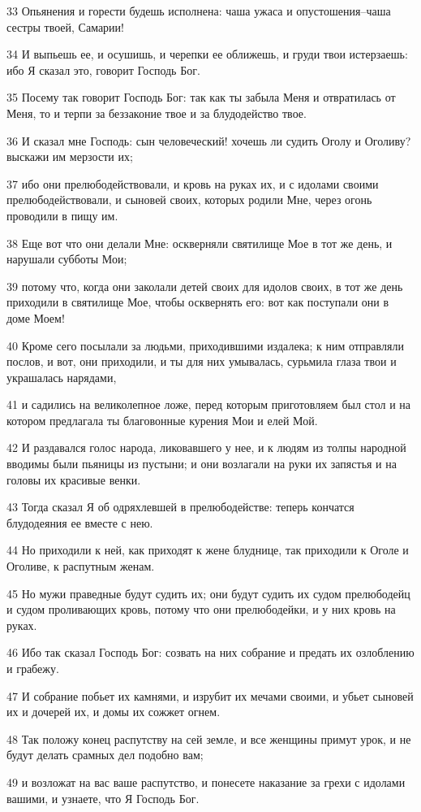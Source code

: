 \par 33 Опьянения и горести будешь исполнена: чаша ужаса и опустошения--чаша сестры твоей, Самарии!
\par 34 И выпьешь ее, и осушишь, и черепки ее оближешь, и груди твои истерзаешь: ибо Я сказал это, говорит Господь Бог.
\par 35 Посему так говорит Господь Бог: так как ты забыла Меня и отвратилась от Меня, то и терпи за беззаконие твое и за блудодейство твое.
\par 36 И сказал мне Господь: сын человеческий! хочешь ли судить Оголу и Оголиву? выскажи им мерзости их;
\par 37 ибо они прелюбодействовали, и кровь на руках их, и с идолами своими прелюбодействовали, и сыновей своих, которых родили Мне, через огонь проводили в пищу им.
\par 38 Еще вот что они делали Мне: оскверняли святилище Мое в тот же день, и нарушали субботы Мои;
\par 39 потому что, когда они заколали детей своих для идолов своих, в тот же день приходили в святилище Мое, чтобы осквернять его: вот как поступали они в доме Моем!
\par 40 Кроме сего посылали за людьми, приходившими издалека; к ним отправляли послов, и вот, они приходили, и ты для них умывалась, сурьмила глаза твои и украшалась нарядами,
\par 41 и садились на великолепное ложе, перед которым приготовляем был стол и на котором предлагала ты благовонные курения Мои и елей Мой.
\par 42 И раздавался голос народа, ликовавшего у нее, и к людям из толпы народной вводимы были пьяницы из пустыни; и они возлагали на руки их запястья и на головы их красивые венки.
\par 43 Тогда сказал Я об одряхлевшей в прелюбодействе: теперь кончатся блудодеяния ее вместе с нею.
\par 44 Но приходили к ней, как приходят к жене блуднице, так приходили к Оголе и Оголиве, к распутным женам.
\par 45 Но мужи праведные будут судить их; они будут судить их судом прелюбодейц и судом проливающих кровь, потому что они прелюбодейки, и у них кровь на руках.
\par 46 Ибо так сказал Господь Бог: созвать на них собрание и предать их озлоблению и грабежу.
\par 47 И собрание побьет их камнями, и изрубит их мечами своими, и убьет сыновей их и дочерей их, и домы их сожжет огнем.
\par 48 Так положу конец распутству на сей земле, и все женщины примут урок, и не будут делать срамных дел подобно вам;
\par 49 и возложат на вас ваше распутство, и понесете наказание за грехи с идолами вашими, и узнаете, что Я Господь Бог.


